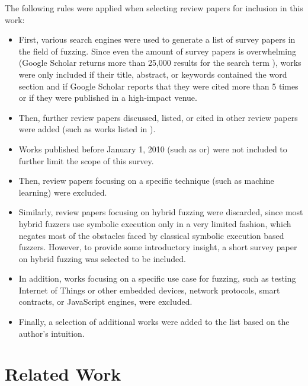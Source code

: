 \documentclass{article}
\begin{document}
\begin{multicols}{2}
    The following rules were applied when selecting review papers for inclusion in this work:
    \begin{itemize}
        \item First, various search engines were used to generate a list of survey papers in the field of fuzzing. Since even the amount of survey papers is overwhelming (Google Scholar\cite{GoogleScholar} returns more than 25,000 results for the search term ), works were only included if their title, abstract, or keywords contained the word section  and if Google Scholar\cite{GoogleScholar} reports that they were cited more than 5 times or if they were published in a high-impact venue.
        \item Then, further review papers discussed, listed, or cited in other review papers were added (such as works listed in \cite{Demystifying}).
        \item Works published before January 1, 2010 (such as\cite{ViolatingAssumptionsWithFuzzing} or\cite{NewTrendsSymbex}) were not included to further limit the scope of this survey.
        \item Then, review papers focusing on a specific technique (such as machine learning\cite{ML1, ML2}) were excluded.
        \item Similarly, review papers focusing on hybrid fuzzing\cite{Hybrid, Exploratory} were discarded, since most hybrid fuzzers use symbolic execution only in a very limited fashion, which negates most of the obstacles faced by classical symbolic execution based fuzzers. However, to provide some introductory insight, a short survey paper on hybrid fuzzing\cite{SurveyHybrid} was selected to be included.
        \item In addition, works focusing on a specific use case for fuzzing, such as testing Internet of Things or other embedded devices\cite{IoT, Embedded, Embedded2}, network protocols\cite{Network, Network2023}, smart contracts\cite{Ethereum}, or JavaScript engines\cite{JavaScript, JavaScript2}, were excluded.
        \item Finally, a selection of additional works were added to the list based on the author's intuition.
    \end{itemize}

    \section{Related Work}
    \label{SurveyPapers}


\end{multicols}
\end{document}
